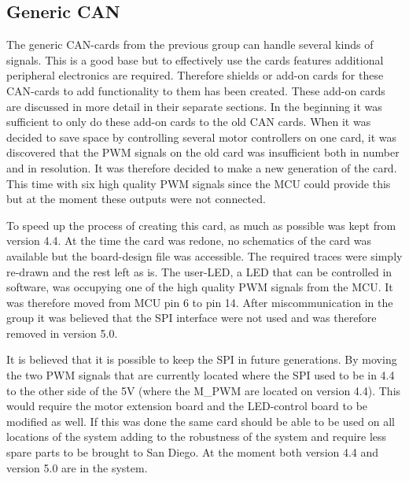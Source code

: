 \subsection{Generic CAN} %
The generic CAN-cards from the previous group can handle several kinds of signals. This is a good base but to effectively use the cards features additional peripheral electronics are required. Therefore shields or add-on cards for these CAN-cards to add functionality to them has been created.  These add-on cards are discussed in more detail in their separate sections. 
In the beginning it was sufficient to only do these add-on cards to the old CAN cards. When it was decided to save space by controlling several motor controllers on one card, it was discovered that the PWM signals on the old card was insufficient both in number and in resolution. It was therefore decided to make a new generation of the card. This time with six high quality PWM signals since the MCU could provide this but at the moment these outputs were not connected. 

To speed up the process of creating this card, as much as possible was kept from version 4.4. At the time the card was redone, no schematics of the card was available but the board-design file was accessible. The required traces were simply re-drawn and the rest left as is. The user-LED, a LED that can be controlled in software, was occupying one of the high quality PWM signals from the MCU. It was therefore moved from MCU pin 6 to pin 14. After miscommunication in the group it was believed that the SPI interface were not used and was therefore removed in version 5.0. 

It is believed that it is possible to keep the SPI in future generations. By moving the two PWM signals that are currently located where the SPI used to be in 4.4 to the other side of the 5V (where the M\_PWM are located on version 4.4). This would require the motor extension board and the LED-control board to be modified as well. If this was done the same card should be able to be used on all locations of the system adding to the robustness of the system and require less spare parts to be brought to San Diego. At the moment both version 4.4 and version 5.0 are in the system.
	
	
